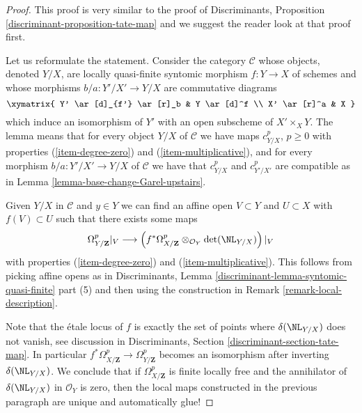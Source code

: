 \begin{proof}
This proof is very similar to the proof of
Discriminants, Proposition \ref{discriminant-proposition-tate-map}
and we suggest the reader look at that proof first.

\medskip\noindent
Let us reformulate the statement. Consider the category
$\mathcal{C}$ whose objects, denoted $Y/X$, are locally quasi-finite syntomic
morphism $f : Y \to X$ of schemes and whose morphisms
$b/a : Y'/X' \to Y/X$ are commutative diagrams
$$
\xymatrix{
Y' \ar[d]_{f'} \ar[r]_b & Y \ar[d]^f \\
X' \ar[r]^a & X
}
$$
which induce an isomorphism of $Y'$ with an open subscheme of
$X' \times_X Y$. The lemma means that for every object
$Y/X$ of $\mathcal{C}$ we have maps $c^p_{Y/X}$, $p \geq 0$
with properties (\ref{item-degree-zero}) and (\ref{item-multiplicative}),
and for every morphism $b/a : Y'/X' \to Y/X$ of $\mathcal{C}$ we have
that $c^p_{Y/X}$ and $c^p_{Y'/X'}$ are compatible as in
Lemma \ref{lemma-base-change-Garel-upstairs}.

\medskip\noindent
Given $Y/X$ in $\mathcal{C}$ and $y \in Y$ we can find
an affine open $V \subset Y$ and $U \subset X$ with $f(V) \subset U$
such that there exists some maps
$$
\Omega^p_{Y/\mathbf{Z}}|_V
\longrightarrow
\left(
f^*\Omega^p_{X/\mathbf{Z}} \otimes_{\mathcal{O}_Y} \det(\NL_{Y/X})
\right)|_V
$$
with properties (\ref{item-degree-zero}) and (\ref{item-multiplicative}).
This follows from picking affine opens as in
Discriminants, Lemma \ref{discriminant-lemma-syntomic-quasi-finite} part (5)
and then using the construction in Remark \ref{remark-local-description}.

\medskip\noindent
Note that the \'etale locus of $f$ is exactly the set of points where
$\delta(\NL_{Y/X})$ does not vanish, see discussion in
Discriminants, Section \ref{discriminant-section-tate-map}.
In particular
$f^*\Omega^p_{X/\mathbf{Z}} \to \Omega^p_{Y/\mathbf{Z}}$
becomes an isomorphism after inverting $\delta(\NL_{Y/X})$.
We conclude that if $\Omega^p_{X/\mathbf{Z}}$ is finite locally free and
the annihilator of $\delta(\NL_{Y/X})$ in $\mathcal{O}_Y$ is zero, then
the local maps constructed in the previous paragraph
are unique and automatically glue!


\end{proof}
